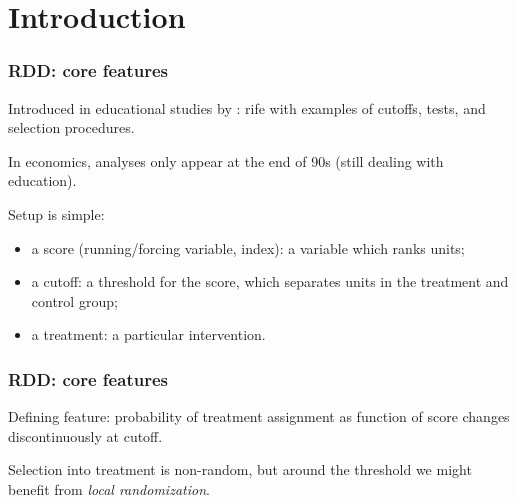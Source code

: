 \documentclass[12pt,english,dvipsnames,aspectratio=169,handout]{beamer}\usepackage[]{graphicx}\usepackage[]{xcolor}
\begin{document}
\section{Introduction}

\begin{frame}
\frametitle{RDD: core features}

Introduced in educational studies by : rife with examples of cutoffs, tests, and selection procedures.\bigskip
\pause

In economics, analyses only appear at the end of 90s (still dealing with education).\bigskip
\pause

Setup is simple:
\begin{itemize}
\item a score (running/forcing variable, index): a variable which ranks units;
\pause
\item a cutoff: a threshold for the score, which separates units in the treatment and control group;
\pause
\item a treatment: a particular intervention.
\end{itemize}

\end{frame}


\begin{frame}
\frametitle{RDD: core features}

Defining feature: probability of treatment assignment as function of score changes discontinuously at cutoff.\bigskip
\pause



\begin{figure}
\centering
{}
\end{figure}
\pause

Selection into treatment is non-random, but around the threshold we might benefit from \textit{local randomization}.
\end{frame}
\end{document}
